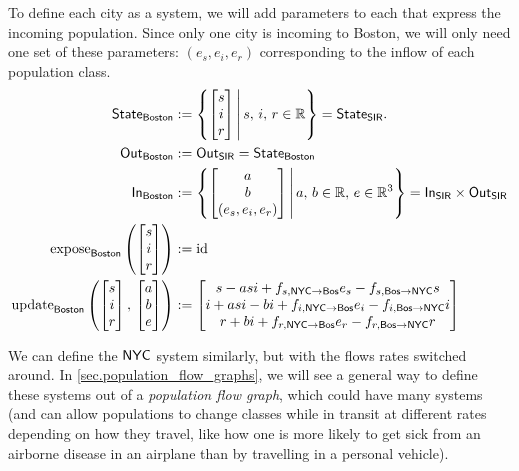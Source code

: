 \documentclass[DynamicalBook]{subfiles}
\begin{document}
\begin{example}
  To define each city as a system, we will add parameters to each
  that express the incoming population. Since only one city is incoming to
  Boston, we will only need one set of these parameters: $(e_s, e_i, e_r)$
  corresponding to the inflow of each population class. 
  \begin{align*}
    \mathsf{State}_{\mathsf{Boston}} &:= \left\{\begin{bmatrix} s \\ i \\ r \end{bmatrix}\, \middle|\, s,\, i,\, r\in \mathbb{R}\right\} = \mathsf{State}_{\mathsf{SIR}}. \\
    \mathsf{Out}_{\mathsf{Boston}} &:= \mathsf{Out}_{\mathsf{SIR}} = \mathsf{State}_{\mathsf{Boston}} \\
    \mathsf{In}_{\mathsf{Boston}} &:= \left\{ \begin{bmatrix} a \\ b \\ (e_s, e_i, e_r)  \end{bmatrix}\, \middle|\, a,\,b\in \mathbb{R},\, e \in \mathbb{R}^3 \right\}= \mathsf{In}_{\mathsf{SIR}} \times \mathsf{Out}_{\mathsf{SIR}}\\
    \mathrm{expose}_{\mathsf{Boston}}\left( \begin{bmatrix} s \\ i \\ r \end{bmatrix}\right) &:= \mathrm{id} \\
    \mathrm{update}_{\mathsf{Boston}}\left( \begin{bmatrix} s\\ i\\ r \end{bmatrix},\, \begin{bmatrix} a\\ b\\  e\end{bmatrix} \right) &:= \begin{bmatrix}s - asi + f_{s, \mathsf{NYC}\to\mathsf{Bos}}e_s - f_{s, \mathsf{Bos}\to\mathsf{NYC}} s \\ i + asi - bi + f_{i, \mathsf{NYC}\to\mathsf{Bos}}e_i - f_{i, \mathsf{Bos}\to\mathsf{NYC}} i \\ r + bi+ f_{r, \mathsf{NYC}\to\mathsf{Bos}}e_r - f_{r, \mathsf{Bos}\to\mathsf{NYC}} r \end{bmatrix} 
  \end{align*}

We can define the $\mathsf{NYC}$ system similarly, but with the flows rates
switched around. In \cref{sec.population_flow_graphs}, we will see a general way
to define these systems out of a \emph{population flow graph}, which could have
many systems (and can allow populations to change classes while in transit at
different rates depending on how they travel, like how one is more likely to get
sick from an airborne disease in an airplane than by travelling in a personal
vehicle).


\end{example}
\end{document}
